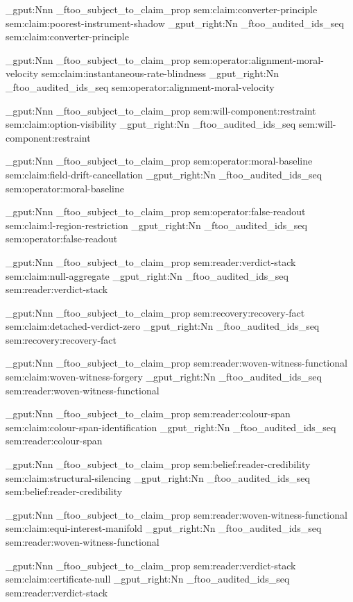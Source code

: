 \prop_gput:Nnn \g_ftoo_subject_to_claim_prop { sem:claim:converter-principle } { sem:claim:poorest-instrument-shadow }
\seq_gput_right:Nn \g_ftoo_audited_ids_seq { sem:claim:converter-principle }

\prop_gput:Nnn \g_ftoo_subject_to_claim_prop { sem:operator:alignment-moral-velocity } { sem:claim:instantaneous-rate-blindness }
\seq_gput_right:Nn \g_ftoo_audited_ids_seq { sem:operator:alignment-moral-velocity }

\prop_gput:Nnn \g_ftoo_subject_to_claim_prop { sem:will-component:restraint } { sem:claim:option-visibility }
\seq_gput_right:Nn \g_ftoo_audited_ids_seq { sem:will-component:restraint }

\prop_gput:Nnn \g_ftoo_subject_to_claim_prop { sem:operator:moral-baseline } { sem:claim:field-drift-cancellation }
\seq_gput_right:Nn \g_ftoo_audited_ids_seq { sem:operator:moral-baseline }

\prop_gput:Nnn \g_ftoo_subject_to_claim_prop { sem:operator:false-readout } { sem:claim:l-region-restriction }
\seq_gput_right:Nn \g_ftoo_audited_ids_seq { sem:operator:false-readout }

\prop_gput:Nnn \g_ftoo_subject_to_claim_prop { sem:reader:verdict-stack } { sem:claim:null-aggregate }
\seq_gput_right:Nn \g_ftoo_audited_ids_seq { sem:reader:verdict-stack }

\prop_gput:Nnn \g_ftoo_subject_to_claim_prop { sem:recovery:recovery-fact } { sem:claim:detached-verdict-zero }
\seq_gput_right:Nn \g_ftoo_audited_ids_seq { sem:recovery:recovery-fact }

\prop_gput:Nnn \g_ftoo_subject_to_claim_prop { sem:reader:woven-witness-functional } { sem:claim:woven-witness-forgery }
\seq_gput_right:Nn \g_ftoo_audited_ids_seq { sem:reader:woven-witness-functional }

\prop_gput:Nnn \g_ftoo_subject_to_claim_prop { sem:reader:colour-span } { sem:claim:colour-span-identification }
\seq_gput_right:Nn \g_ftoo_audited_ids_seq { sem:reader:colour-span }

\prop_gput:Nnn \g_ftoo_subject_to_claim_prop { sem:belief:reader-credibility } { sem:claim:structural-silencing }
\seq_gput_right:Nn \g_ftoo_audited_ids_seq { sem:belief:reader-credibility }

\prop_gput:Nnn \g_ftoo_subject_to_claim_prop { sem:reader:woven-witness-functional } { sem:claim:equi-interest-manifold }
\seq_gput_right:Nn \g_ftoo_audited_ids_seq { sem:reader:woven-witness-functional }

\prop_gput:Nnn \g_ftoo_subject_to_claim_prop { sem:reader:verdict-stack } { sem:claim:certificate-null }
\seq_gput_right:Nn \g_ftoo_audited_ids_seq { sem:reader:verdict-stack }

